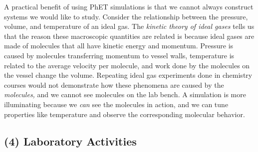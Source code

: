 \documentclass[../../../main.tex]{subfiles}
\begin{document}
A practical benefit of using PhET simulations is that we cannot always construct systems we would like to study.  Consider the relationship between the pressure, volume, and temperature of an ideal gas.  The \textit{kinetic theory of ideal gases} tells us that the reason these macroscopic quantities are related is because ideal gases are made of molecules that all have kinetic energy and momentum.  Pressure is caused by molecules transferring momentum to vessel walls, temperature is related to the average velocity per molecule, and work done by the molecules on the vessel change the volume.  Repeating ideal gas experiments done in chemistry courses would not demonstrate how these phenomena are caused by the \textit{molecules,} and we cannot see molecules on the lab bench.  A simulation is more illuminating because we \textit{can} see the molecules in action, and we can tune properties like temperature and observe the corresponding molecular behavior.

\subsection{(4) Laboratory Activities}
\end{document}
